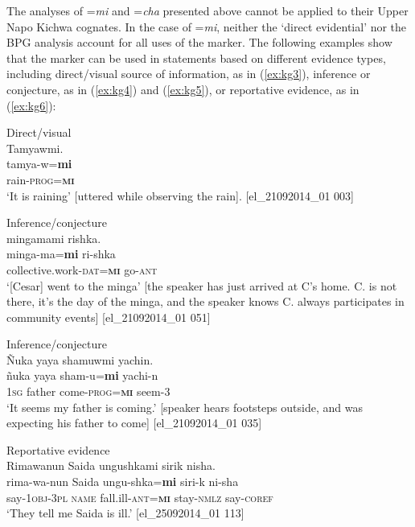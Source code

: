 \documentclass[output=paper]{langscibook}
\begin{document}
The analyses of =\textit{mi} and =\textit{cha} presented above cannot be applied to their Upper Napo Kichwa cognates. In the case of =\textit{mi}, neither the ‘direct evidential’ nor the BPG analysis account for all uses of the marker. The following examples show that the marker can be used in statements based on different evidence types, including direct/visual source of information, as in (\ref{ex:kg3}), inference or conjecture, as in (\ref{ex:kg4}) and (\ref{ex:kg5}), or reportative evidence, as in (\ref{ex:kg6}):

\begin{exe}
	\ex Direct/visual\label{ex:kg3}\\
	\glll Tamyawmi.\\
	tamya-w=\textbf{mi}\\
	rain-\textsc{prog}=\textbf{\textsc{mi}}\\
	\trans ‘It is raining’ [uttered while observing the rain]. [el\_21092014\_01 003]
\end{exe}

\begin{exe}
	\ex Inference/conjecture\label{ex:kg4}\\
	\glll [Cesar] mingamami rishka.\\
	[Cesar] minga-ma=\textbf{mi} ri-shka\\
	[Cesar] collective.work-\textsc{dat}=\textbf{\textsc{mi}} go-\textsc{ant}\\
	\trans ‘[Cesar] went to the minga’ [the speaker has just arrived at C’s home. C. is not there, it’s the day of the minga, and the speaker knows C. always participates in community events] [el\_21092014\_01 051]
\end{exe}

\begin{exe}
	\ex Inference/conjecture\label{ex:kg5}\\
	\glll Ñuka yaya shamuwmi yachin.\\
	ñuka yaya sham-u=\textbf{mi} yachi-n \\
	1\textsc{sg} father come-\textsc{prog}=\textbf{\textsc{mi}} seem-3\\
	\trans ‘It seems my father is coming.’ [speaker hears footsteps outside, and was expecting his father to come] [el\_21092014\_01 035]
\end{exe}

\begin{exe}
	\ex Reportative evidence\label{ex:kg6}\\
	\glll Rimawanun Saida ungushkami sirik nisha.\\
	rima-wa-nun Saida ungu-shka=\textbf{mi} siri-k ni-sha\\
	say-1\textsc{obj}-3\textsc{pl} \textsc{name} fall.ill-\textsc{ant}=\textbf{\textsc{mi}} stay-\textsc{nmlz} say-\textsc{coref}\\
	\trans ‘They tell me Saida is ill.’ [el\_25092014\_01 113]
\end{exe}
\end{document}
